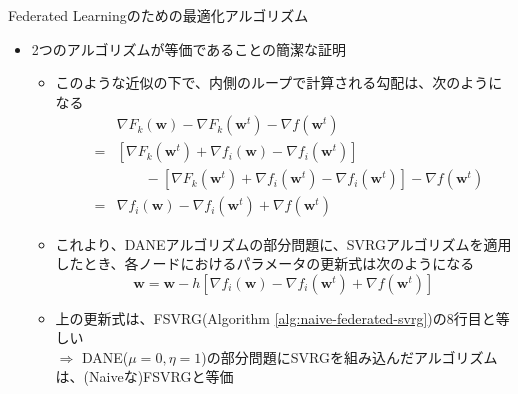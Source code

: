 \documentclass[dvipdfmx,notheorems,t]{beamer}
\begin{document}
\begin{frame}{Federated Learningのための最適化アルゴリズム}

\begin{itemize}
	\item 2つのアルゴリズムが等価であることの簡潔な証明
	\begin{itemize}
		\item このような近似の下で、内側のループで計算される勾配は、次のようになる
		\begin{eqnarray}
			&& \nabla F_k(\bm{w}) - \nabla F_k(\bm{w}^t) - \nabla f(\bm{w}^t) \\
			&=& \left[ \nabla F_k(\bm{w}^t) + \nabla f_i(\bm{w}) - \nabla f_i(\bm{w}^t) \right] \nonumber \\
			&& \qquad - \left[ \nabla F_k(\bm{w}^t) + \nabla f_i(\bm{w}^t) - \nabla f_i(\bm{w}^t) \right] - \nabla f(\bm{w}^t) \\
			&=& \nabla f_i(\bm{w}) - \nabla f_i(\bm{w}^t) + \nabla f(\bm{w}^t)
		\end{eqnarray}
		
		\item これより、DANEアルゴリズムの部分問題に、SVRGアルゴリズムを適用したとき、各ノードにおけるパラメータの更新式は次のようになる
		\begin{equation}
			\bm{w} = \bm{w} - h \left[ \nabla f_i(\bm{w}) - \nabla f_i(\bm{w}^t) + \nabla f(\bm{w}^t) \right]
		\end{equation}
		
		\item 上の更新式は、FSVRG(Algorithm \ref{alg:naive-federated-svrg})の8行目と等しい \\
		$\Rightarrow$ DANE($\mu = 0, \eta = 1$)の部分問題にSVRGを組み込んだアルゴリズムは、(Naiveな)FSVRGと等価
	\end{itemize}
\end{itemize}

\end{frame}
\end{document}
